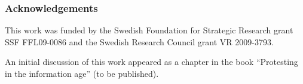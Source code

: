\mode*

\subsubsection*{Acknowledgements}

This work was funded by the Swedish Foundation for Strategic Research grant SSF 
FFL09-0086 and the Swedish Research Council grant VR 2009-3793.

An initial discussion of this work appeared as a chapter in the book 
\enquote{Protesting in the information age} (to be published).
